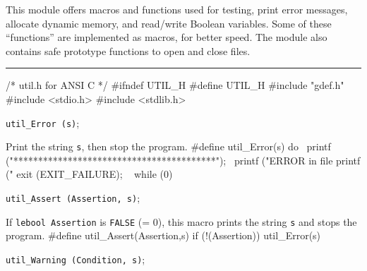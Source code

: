 
This module offers macros and functions used for testing, print error messages,
allocate dynamic memory, and read/write Boolean variables.
Some of these ``functions'' are implemented as macros, for better speed.
The module also contains safe prototype functions to open and close files.


\bigskip\hrule

\code\hide
/* util.h  for ANSI C */
#ifndef UTIL_H
#define UTIL_H
\endhide
#include "gdef.h"
#include <stdio.h>
#include <stdlib.h>
\endcode


\noindent
{\tt util\_Error (s)};

 \tab  Print the string {\tt s}, then stop the program.
 \endtab
\code
\hide
#define util_Error(s) do { \
   printf ("\n\n******************************************\n"); \
   printf ("ERROR in file %
   printf ("%
   exit (EXIT_FAILURE); \
   } while (0)
\endhide
\endcode

\noindent
{\tt util\_Assert (Assertion, s)};

 \tab  If {\tt lebool Assertion} is {\tt FALSE} (= 0),
  this macro prints the string {\tt s} and stops the program.
 \endtab
\code
\hide
#define util_Assert(Assertion,s) if (!(Assertion)) util_Error(s)
\endhide
\endcode

\noindent
{\tt util\_Warning (Condition, s)};

